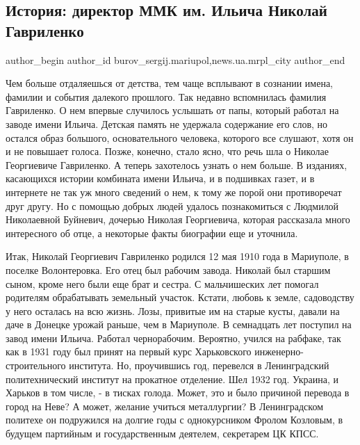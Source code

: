  
 
 
 
 
 
\subsection{История: директор ММК им. Ильича Николай Гавриленко}
\label{sec:10_03_2017.stz.news.ua.mrpl_city.1.istoria_direktor_mmk_im_iljicha_nikolaj_gavrilenko}
 
\ifcmt
 author_begin
   author_id burov_sergij.mariupol,news.ua.mrpl_city
 author_end
\fi


Чем больше отдаляешься от детства, тем чаще всплывают в сознании имена, фамилии
и события далекого прошлого.  Так недавно вспомнилась фамилия  Гавриленко. О
нем впервые случилось  услышать от папы, который работал на заводе имени
Ильича. Детская память не удержала содержание его слов, но остался образ
большого, основательного человека, которого все слушают, хотя он и не повышает
голоса. Позже, конечно, стало ясно, что речь шла о Николае Георгиевиче
Гавриленко. А теперь захотелось узнать о нем больше. В изданиях, касающихся
истории комбината имени Ильича, и в подшивках газет, и в интернете не так уж
много сведений о нем, к тому же порой они противоречат друг другу. Но с помощью
добрых людей удалось познакомиться с Людмилой Николаевной Буйневич, дочерью
Николая Георгиевича, которая рассказала много интересного об отце, а некоторые
факты биографии еще и уточнила.

Итак, Николай Георгиевич Гавриленко родился 12 мая 1910 года в Мариуполе, в
поселке Волонтеровка.  Его отец был  рабочим завода. Николай был старшим сыном,
кроме него были еще брат и сестра. С мальчишеских лет помогал родителям
обрабатывать земельный участок. Кстати, любовь к земле, садоводству у него
осталась на всю жизнь. Лозы, привитые им на старые кусты, давали на даче в
Донецке урожай раньше, чем в Мариуполе. В семнадцать лет поступил на завод
имени Ильича. Работал чернорабочим. Вероятно,  учился на рабфаке, так как в
1931 году был принят на первый курс Харьковского инженерно-строительного
института. Но, проучившись год, перевелся в Ленинградский политехнический
институт на прокатное отделение. Шел 1932 год. Украина, и Харьков в том числе,
-  в тисках голода. Может, это и было причиной перевода в город на Неве? А
может, желание учиться металлургии? В Ленинградском политехе он подружился на
долгие годы с однокурсником Фролом Козловым, в будущем партийным и
государственным деятелем, секретарем ЦК КПСС.


